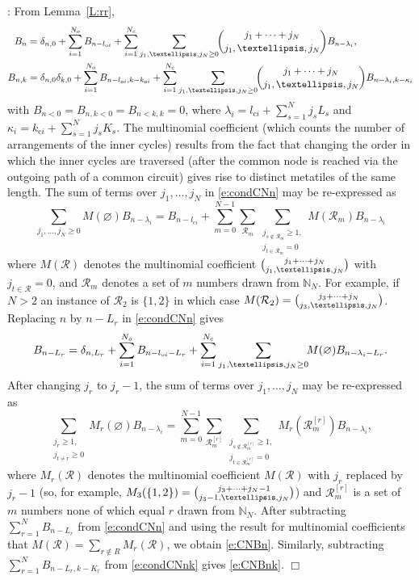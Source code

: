 \documentclass[preprint,3p]{elsarticle}
\providecommand{\Nset}{\mathbb{N}}
\newcommand{\rb}[1]{_{\rm #1}} %
\newenvironment{proof}[1][]%
{\noindent\textit{\ifthenelse{\equal{#1}{}}{Proof}{Proof #1}}: }%
{\leavevmode\unskip\nobreak\quad\hspace*{\fill}$\Box$\par}
\begin{document}
\begin{proof}
From Lemma~\ref{L:rr},
\begin{subequations}
\begin{align}\label{e:condCNn}
B_n&=\delta_{n,0}+\sum_{i=1}^{N\rb{o}}B_{n-l_{\mathrm{o}i}}+
\sum_{i=1}^{N\rb{c}}\sum_{j_1,\ldots,j_N\ge0}\!\!
\binom{j_1+\cdots+j_N}{j_1,\ldots,j_N}B_{n-\lambda_i},\\
\label{e:condCNnk}
B_{n,k}&=\delta_{n,0}\delta_{k,0}
+\sum_{i=1}^{N\rb{o}}B_{n-l_{\mathrm{o}i},k-k_{\mathrm{o}i}}+
\sum_{i=1}^{N\rb{c}}\sum_{j_1,\ldots,j_N\ge0}\!\!
\binom{j_1+\cdots+j_N}{j_1,\ldots,j_N}B_{n-\lambda_i,k-\kappa_i}
\end{align}
\end{subequations}
with $B_{n<0}=B_{n,k<0}=B_{n<k,k}=0$, 
where $\lambda_i=l_{\mathrm{c}i}+\sum_{s=1}^Nj_sL_s$ and 
$\kappa_i=k_{\mathrm{c}i}+\sum_{s=1}^Nj_sK_s$. 
The multinomial coefficient (which counts the number of
arrangements of the inner cycles) results from the fact that changing
the order in which the inner cycles are traversed (after the common
node is reached via the outgoing path of a common circuit) gives rise to
distinct metatiles of the same length.  The sum of terms over $j_1,\ldots,j_N$
in \eqref{e:condCNn} may be re-expressed as
\[
\sum_{j_1,\ldots,j_N\ge0}\!\!M(\varnothing)B_{n-\lambda_i}=
B_{n-l_{\mathrm{c}i}}+
\sum_{m=0}^{N-1}\sum_{\mathcal{R}_m}
\sum_{\substack{j_{s\notin\mathcal{R}_m}\geq1,\\j_{t\in\mathcal{R}_m}=0}}\!\!\!\!
M(\mathcal{R}_m)B_{n-\lambda_i}
\]
where $M(\mathcal{R})$ denotes the multinomial coefficient
$\tbinom{j_1+\cdots+j_N}{j_1,\ldots,j_N}$ with $j_{t\in\mathcal{R}}=0$,
and $\mathcal{R}_m$ denotes a set of $m$ numbers drawn from $\Nset_N$.  
For example, if $N>2$ an instance of $\mathcal{R}_2$ is $\{1,2\}$ in which case
$M(\mathcal{R}_2)=\tbinom{j_3+\cdots+j_N}{j_3,\ldots,j_N}$. 
Replacing $n$ by $n-L_r$ in
\eqref{e:condCNn} gives
\[
B_{n-L_r}=\delta_{n,L_r}+\sum_{i=1}^{N\rb{o}}B_{n-l_{\mathrm{o}i}-L_r}+
\sum_{i=1}^{N\rb{c}}\sum_{j_1,\ldots,j_N\ge0}\!\!
M(\varnothing)B_{n-\lambda_i-L_r}.
\]
After changing $j_r$ to $j_r-1$, 
the sum of terms over $j_1,\ldots,j_N$ may be re-expressed as
\[
\sum_{\substack{j_r\geq1,\\j_{t\neq r}\geq0}}\!\!\!\!
M_r(\varnothing)B_{n-\lambda_i}
=\sum_{m=0}^{N-1}\sum_{\mathcal{R}_m^{[r]}}
\sum_{\substack{j_{s\notin\mathcal{R}_m^{[r]}}\geq1,\\j_{t\in\mathcal{R}_m^{[r]}}=0}}\!\!\!\!
M_r(\mathcal{R}_m^{[r]})B_{n-\lambda_i},
\]
where $M_r(\mathcal{R})$ denotes the multinomial coefficient
$M(\mathcal{R})$ with $j_r$ replaced by $j_r-1$ (so, for example,
$M_3(\{1,2\})=\tbinom{j_3+\cdots+j_N-1}{j_3-1,\ldots,j_N}$) and
$\mathcal{R}_m^{[r]}$ is a set of $m$ numbers none of which equal $r$ 
drawn from $\Nset_N$.  After subtracting $\sum_{r=1}^N B_{n-L_r}$ from
\eqref{e:condCNn} and using the result for multinomial coefficients
that $M(\mathcal{R})=\sum_{r\notin R}M_r(\mathcal{R})$, we obtain
\eqref{e:CNBn}. Similarly, subtracting $\sum_{r=1}^N B_{n-L_r,k-K_r}$ from
\eqref{e:condCNnk} gives \eqref{e:CNBnk}.
\end{proof}
\end{document}
